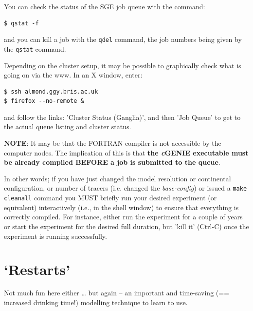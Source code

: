 \documentclass[11pt,fleqn]{book} %
\begin{document}
\begin{itemize}[noitemsep]
\end{itemize}

\noindent You can check the status of the SGE job queue with the command:
\vspace{-2pt}\begin{verbatim}$ qstat -f\end{verbatim}\vspace{-2pt}
and you can kill a job with the \texttt{qdel} command, the job numbers being given by the \texttt{qstat} command.

Depending on the cluster setup, it may be possible to graphically check what is going on via the www. In an X window, enter:
\vspace{-2pt}\begin{verbatim}$ ssh almond.ggy.bris.ac.uk
$ firefox --no-remote &\end{verbatim}\vspace{-2pt}
and follow the links: 'Cluster Status (Ganglia)', and then 'Job Queue' to get to the actual queue listing and cluster status.

\noindent \textbf{NOTE}: It may be that the FORTRAN compiler is not accessible by the computer nodes. The implication of this is that \textbf{the \textit{c}GENIE executable must be already compiled BEFORE a job is submitted to the queue}.

\noindent In other words; if you have just changed the model resolution or continental configuration, or number of tracers (i.e. changed the \textit{base-config}) or issued a \texttt{make cleanall} command you MUST briefly run your desired experiment (or equivalent) interactively (i.e., in the shell window) to ensure that everything is correctly compiled. For instance, either run the experiment for a couple of years or start the experiment for the desired full duration, but 'kill it' (Ctrl-C) once the experiment is running successfully.


\newpage


\section{‘Restarts’}

Not much fun here either … but again – an important and time-saving (== increased drinking time!) modelling technique to learn to use.
\end{document}
